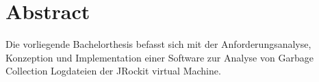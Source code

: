 \chapter*{Abstract}
Die vorliegende Bachelorthesis befasst sich mit der Anforderungsanalyse, Konzeption und Implementation einer Software zur Analyse von Garbage Collection Logdateien der JRockit virtual Machine.